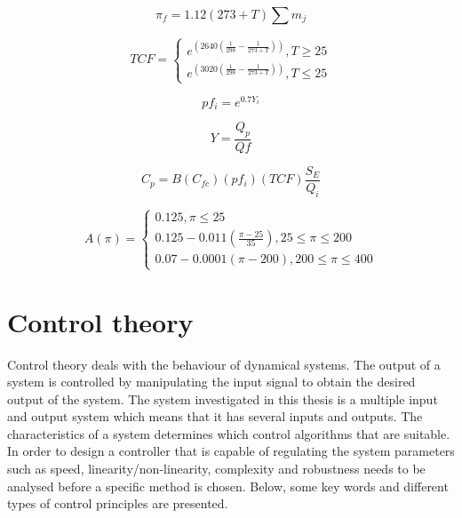 \begin{equation}
\label{eq:feedOsmP}
\pi_{f}= 1.12(273+T) \sum m_{j}
\end{equation}

\begin{equation}
\label{eq:TCF}
TCF =
\begin{cases}
e^{(2640(\frac{1}{298}- \frac{1}{273+T}))} , T\geq25 \\
e^{(3020(\frac{1}{298}- \frac{1}{273+T}))} , T\leq25
\end{cases}
\end{equation}

\begin{equation}
\label{eq:polfac}
pf_{i} = e^{0.7Y_{i}}
\end{equation}

\begin{equation}
\label{eq:recov}
Y= \frac{Q_{p}}{Q{f}}
\end{equation}

\begin{equation}
\label{eq:permC}
C_{p}=B(C_{fc})({pf_{i}})(TCF)\frac{S_{E}}{Q_{i}}
\end{equation}

\begin{equation}
\label{eq:permability}
A(\pi) =
\begin{cases} 
0.125 , \pi \leq 25 \\
0.125-0.011(\frac{\pi - 25}{35}) , 25 \leq \pi \leq 200 \\ 
0.07-0.0001(\pi-200) , 200 \leq \pi \leq 400  
\end{cases}
\end{equation}

\section{Control theory}
Control theory deals with the behaviour of dynamical systems. The output of a system is controlled by manipulating the input signal to obtain the desired output of the system. The system investigated in this thesis is a multiple input and output system which means that it has several inputs and outputs. The characteristics of a system determines which control algorithms that are suitable. In order to design a controller that is capable of regulating the system parameters such as speed, linearity/non-linearity, complexity and robustness needs to be analysed before a specific method is chosen. Below, some key words and different types of control principles are presented. \\
\\


